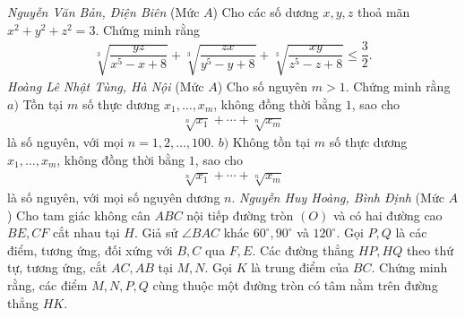 \begin{multicols}{2}
\begin{figure}[H]
		\vspace*{-15pt}
	\end{figure}
	\hfill	\textit{\small Nguyễn Văn Bản, Điện Biên}
	\vskip 0.05cm
	{}
	(Mức $A$) Cho các số dương $x,y,z$ thoả mãn $x^2+y^2+z^2=3$. Chứng minh rằng
	\begin{align*}
		\sqrt[3]{\dfrac{y z}{x^5\!-\!x\!+\!8}}\!+\!\sqrt[3]{\dfrac{z x}{y^5\!-\!y\!+\!8}}\!+\!\sqrt[3]{\dfrac{x y}{z^5\!-\!z\!+\!8}} \!\le\! \dfrac{3}{2}.
	\end{align*}
	\hfill \textit{Hoàng Lê Nhật Tùng, Hà Nội}
	\vskip 0.05cm
	{}
	(Mức $A$) Cho số nguyên $m>1$. Chứng minh rằng
	\vskip 0.05cm
	$a)$ Tồn tại $m$ số thực dương $x_1,\ldots,x_m$, không đồng thời bằng $1$, sao cho
	\begin{align*}
		\sqrt[n]{x_1}+\cdots+\sqrt[n]{x_m}
	\end{align*}
	là số nguyên, với mọi $n=1,2,\ldots,100$.
	\vskip 0.05cm
	$b)$ Không tồn  tại $m$ số thực dương $x_1,\ldots,x_m$, không đồng thời bằng $1$, sao cho
	\begin{align*}
		\sqrt[n]{x_1}+\cdots+\sqrt[n]{x_m}
	\end{align*}
	là số nguyên, với mọi số nguyên dương $n$.
	\vskip 0.05cm
	\hfill	\textit{\small Nguyễn Huy Hoàng, Bình Định}
	\vskip 0.05cm
	\columnbreak
	{}
	(Mức $A$) Cho tam giác không cân $ABC$ nội tiếp đường tròn $(O)$ và có hai đường cao $BE,CF$ cắt nhau tại $H$. Giả sử   $\angle BAC$ khác $60^\circ,90^\circ$ và $120^\circ$.  Gọi $P, Q$ là các điểm, tương ứng, đối xứng với $B,C $ qua $F, E$. Các đường thẳng $HP, HQ$ theo thứ tự, tương ứng, cắt $AC, AB$ tại $M, N$.  Gọi $K$ là trung điểm của $BC$. Chứng minh rằng, các điểm $M, N, P, Q$ cùng thuộc một đường tròn có tâm nằm trên đường thẳng $HK$.
	\begin{figure}[H]
		\vspace*{-15pt}
		\centering
		\captionsetup{labelformat= empty, justification=centering}

\end{figure}
\end{multicols}
